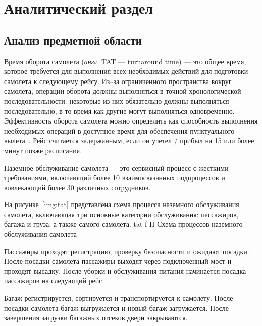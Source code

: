 \chapter{Аналитический раздел}


\section{Анализ предметной области}

Время оборота самолета (\textit{англ.} TAT --- turnaround time) --- это общее время, которое требуется для выполнения всех необходимых действий для подготовки самолета к следующему рейсу.
Из--за ограниченного пространства вокруг самолета, операции оборота должны выполняться в точной хронологической последовательности: некоторые из них обязательно должны выполняться последовательно, в то время как другие могут выполняться одновременно.
Эффективность оборота самолета можно определить как способность выполнения необходимых операций в доступное время для обеспечения пунктуального вылета~\cite{otplane}.
Рейс считается задержанным, если он улетел / прибыл на 15 или более минут позже расписания.

Наземное обслуживание самолета --- это сервисный процесс с жесткими требованиями, включающий более 10 взаимосвязанных подпроцессов и вовлекающий более 30 различных сотрудников.

На рисунке~\ref{img:tat} представлена схема процесса наземного обслуживания самолета, включающая три основные категории обслуживания: пассажиров, багажа и груза, а также самого самолета.
    {tat}
    {f}
    {H}
    {\textwidth}
    {Схема процессов наземного обслуживания самолета}


Пассажиры проходят регистрацию, проверку безопасности и ожидают посадки.
После посадки самолета пассажиры выходят через подключенный мост и проходят высадку.
После уборки и обслуживания питания начинается посадка пассажиров на следующий рейс.

Багаж регистрируется, сортируется и транспортируется к самолету.
После посадки самолета багаж выгружается и новый багаж загружается.
После завершения загрузки багажных отсеков двери закрываются.

